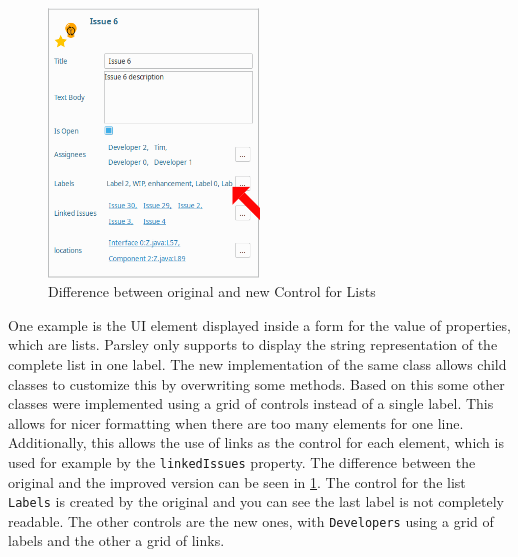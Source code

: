 \begin{figure}[!h]
	\centering
	\includegraphics[width=0.5\textwidth]{graphics/screenshot_improvement_fromControl_arrow.png}
	\caption{Difference between original and new Control for Lists}
	\label{fig:c4:screenshot_improvement_formControl}
\end{figure}
One example is the \gls{UI} element displayed inside a form for the value of properties, which are lists.
Parsley only supports to display the string representation of the complete list in one label.
The new implementation of the same class allows child classes to customize this by overwriting some methods.
Based on this some other classes were implemented using a grid of controls instead of a single label.
This allows for nicer formatting when there are too many elements for one line.
Additionally, this allows the use of links as the control for each element, which is used for example by the \lstinline|linkedIssues| property.
The difference between the original and the improved version can be seen in \cref{fig:c4:screenshot_improvement_formControl}.
The control for the list \lstinline|Labels| is created by the original and you can see the last label is not completely readable.
The other controls are the new ones, with \lstinline|Developers| using a grid of labels and the other a grid of links.

